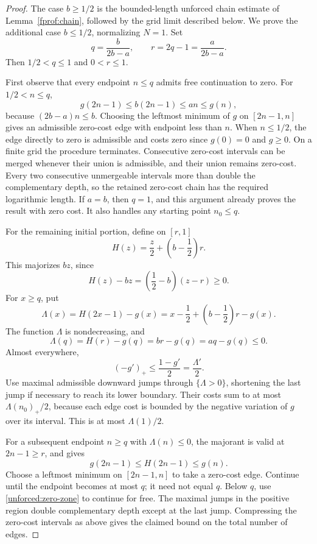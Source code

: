 \begin{proof}
The case \(b\ge1/2\) is the bounded-length unforced chain estimate of
Lemma~\ref{fprof:chain}, followed by the grid limit described below. We prove the additional case \(b\le1/2\),
normalizing \(N=1\). Set
$$
 q=\frac{b}{2b-a},\qquad r=2q-1=\frac{a}{2b-a}.
$$
Then \(1/2<q\le1\) and \(0<r\le1\).

First observe that every endpoint \(n\le q\) admits free continuation
to zero. For \(1/2<n\le q\),
\begin{equation}\label{unforced:zero-zone}
 g(2n-1)\le b(2n-1)\le an\le g(n),
\end{equation}
because \((2b-a)n\le b\). Choosing the leftmost minimum of \(g\)
on \([2n-1,n]\) gives an admissible zero-cost edge with endpoint less
than \(n\). When \(n\le1/2\), the edge directly to zero is admissible
and costs zero since \(g(0)=0\) and \(g\ge0\). On a finite grid the
procedure terminates. Consecutive zero-cost intervals can be merged whenever
their union is admissible, and their union remains zero-cost. Every two
consecutive unmergeable intervals more than double the complementary depth,
so the retained zero-cost chain has the required logarithmic length.
If \(a=b\), then \(q=1\), and this argument already proves the result
with zero cost. It also handles any starting point \(n_0\le q\).

For the remaining initial portion, define on \([r,1]\)
$$
 H(z)=\frac z2+\left(b-\frac12\right)r.
$$
This majorizes \(bz\), since
$$
 H(z)-bz=\left(\frac12-b\right)(z-r)\ge0.
$$
For \(x\ge q\), put
$$
 \Lambda(x)=H(2x-1)-g(x)
 =x-\frac12+\left(b-\frac12\right)r-g(x).
$$
The function \(\Lambda\) is nondecreasing, and
$$
 \Lambda(q)=H(r)-g(q)=br-g(q)=aq-g(q)\le0.
$$
Almost everywhere,
$$
 (-g')_+\le\frac{1-g'}2=\frac{\Lambda'}2.
$$
Use maximal admissible downward jumps through \(\{\Lambda>0\}\),
shortening the last jump if necessary to reach its lower boundary. Their
costs sum to at most \(\Lambda(n_0)_+/2\), because each edge cost is
bounded by the negative variation of \(g\) over its interval. This is at
most \(\Lambda(1)/2\).

For a subsequent endpoint \(n\ge q\) with \(\Lambda(n)\le0\), the
majorant is valid at \(2n-1\ge r\), and gives
$$
 g(2n-1)\le H(2n-1)\le g(n).
$$
Choose a leftmost minimum on \([2n-1,n]\) to take a zero-cost edge.
Continue until the endpoint becomes at most \(q\); it need not equal
\(q\). Below \(q\), use \eqref{unforced:zero-zone} to continue for free.
The maximal jumps in the positive region double complementary depth except
at the last jump. Compressing the zero-cost intervals as above gives the
claimed bound on the total number of edges.


\end{proof}
